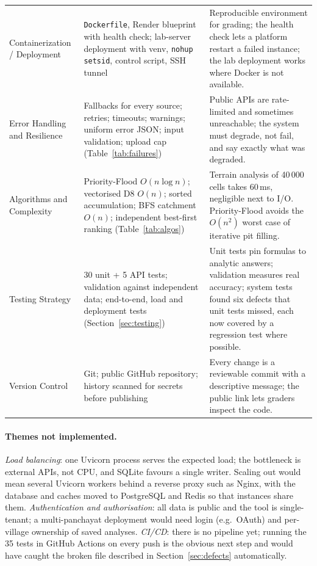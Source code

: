 \documentclass[manuscript,screen,review]{acmart}
\newcommand{\code}[1]{\texttt{\small #1}}
\begin{document}
\begin{table}[t]
\begin{tabularx}{\linewidth}{@{}P{2.5cm}P{4.6cm}Y@{}}
    Containerization / Deployment & \code{Dockerfile}, Render blueprint with health check; lab-server deployment with venv, \code{nohup setsid}, control script, SSH tunnel & Reproducible environment for grading; the health check lets a platform restart a failed instance; the lab deployment works where Docker is not available. \\
    Error Handling and Resilience & Fallbacks for every source; retries; timeouts; warnings; uniform error JSON; input validation; upload cap (Table~\ref{tab:failures}) & Public APIs are rate-limited and sometimes unreachable; the system must degrade, not fail, and say exactly what was degraded. \\
    Algorithms and Complexity & Priority-Flood $O(n\log n)$; vectorised D8 $O(n)$; sorted accumulation; BFS catchment $O(n)$; independent best-first ranking (Table~\ref{tab:algos}) & Terrain analysis of 40\,000 cells takes 60\,ms, negligible next to I/O. Priority-Flood avoids the $O(n^2)$ worst case of iterative pit filling. \\
    Testing Strategy & 30 unit + 5 API tests; validation against independent data; end-to-end, load and deployment tests (Section~\ref{sec:testing}) & Unit tests pin formulas to analytic answers; validation measures real accuracy; system tests found six defects that unit tests missed, each now covered by a regression test where possible. \\
    Version Control & Git; public GitHub repository; history scanned for secrets before publishing & Every change is a reviewable commit with a descriptive message; the public link lets graders inspect the code. \\
    \bottomrule
  \end{tabularx}
\end{table}

\paragraph{Themes not implemented.} \emph{Load balancing}: one Uvicorn process serves the
expected load; the bottleneck is external APIs, not CPU, and SQLite favours a single writer.
Scaling out would mean several Uvicorn workers behind a reverse proxy such as Nginx, with the
database and caches moved to PostgreSQL and Redis so that instances share them.
\emph{Authentication and authorisation}: all data is public and the tool is single-tenant; a
multi-panchayat deployment would need login (e.g.\ OAuth) and per-village ownership of saved
analyses. \emph{CI/CD}: there is no pipeline yet; running the 35 tests in GitHub Actions on every
push is the obvious next step and would have caught the broken file described in
Section~\ref{sec:defects} automatically.
\end{document}
